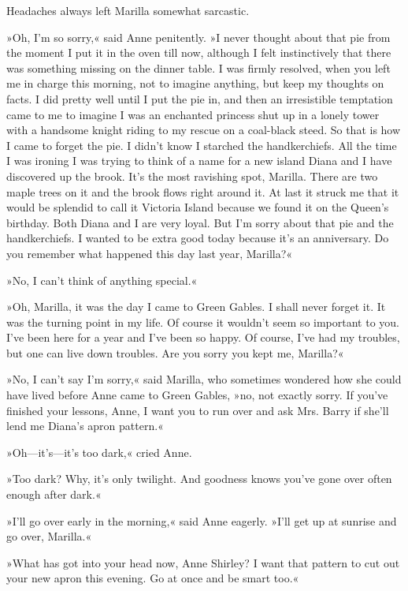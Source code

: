 Headaches always left Marilla somewhat sarcastic.

»Oh, I'm so sorry,« said Anne penitently. »I never thought about that pie from the moment I put it in the oven till now, although I felt instinctively that there was something missing on the dinner table. I was firmly resolved, when you left me in charge this morning, not to imagine anything, but keep my thoughts on facts. I did pretty well until I put the pie in, and then an irresistible temptation came to me to imagine I was an enchanted princess shut up in a lonely tower with a handsome knight riding to my rescue on a coal-black steed. So that is how I came to forget the pie. I didn't know I starched the handkerchiefs. All the time I was ironing I was trying to think of a name for a new island Diana and I have discovered up the brook. It's the most ravishing spot, Marilla. There are two maple trees on it and the brook flows right around it. At last it struck me that it would be splendid to call it Victoria Island because we found it on the Queen's birthday. Both Diana and I are very loyal. But I'm sorry about that pie and the handkerchiefs. I wanted to be extra good today because it's an anniversary. Do you remember what happened this day last year, Marilla?«

»No, I can't think of anything special.«

»Oh, Marilla, it was the day I came to Green Gables. I shall never forget it. It was the turning point in my life. Of course it wouldn't seem so important to you. I've been here for a year and I've been so happy. Of course, I've had my troubles, but one can live down troubles. Are you sorry you kept me, Marilla?«

»No, I can't say I'm sorry,« said Marilla, who sometimes wondered how she could have lived before Anne came to Green Gables, »no, not exactly sorry. If you've finished your lessons, Anne, I want you to run over and ask Mrs. Barry if she'll lend me Diana's apron pattern.«

»Oh—it's—it's too dark,« cried Anne.

»Too dark? Why, it's only twilight. And goodness knows you've gone over often enough after dark.«

»I'll go over early in the morning,« said Anne eagerly. »I'll get up at sunrise and go over, Marilla.«

»What has got into your head now, Anne Shirley? I want that pattern to cut out your new apron this evening. Go at once and be smart too.«

